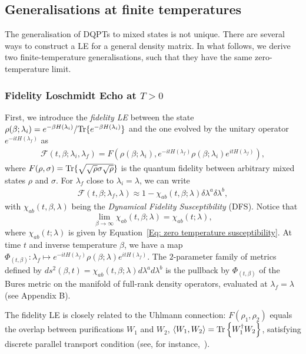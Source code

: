 \subsection{Generalisations at finite temperatures}
\label{Subsec: DQPT for pure states}


The generalisation of DQPTs to mixed states is not unique. There are several ways to construct a LE for a general density matrix. In what follows, we derive two finite-temperature generalisations, such that they have the same zero-temperature limit. \\
\subsubsection{Fidelity Loschmidt Echo at $T>0$}


First, we introduce the {\em fidelity LE} between the state $\rho(\beta;\lambda_i)=e^{-\beta H(\lambda_i)}/\text{Tr}\{e^{-\beta H(\lambda_i)}\}$ and the one evolved by the unitary operator $e^{-it H(\lambda_f)}$ as
\begin{eqnarray}
\!\!\!\!\!\!\mathcal{F}(t,\beta;\lambda_i,\lambda_f)\!=\!F(\rho(\beta;\lambda_i),e^{-it H(\lambda_f)}\rho(\beta;\lambda_i)e^{itH(\lambda_f)}),
\label{eq:fid}
\end{eqnarray}
where $F(\rho,\sigma)=\text{Tr}\{\sqrt{\sqrt{\rho}\sigma\sqrt{\rho}}\}$ is the quantum fidelity between arbitrary mixed states $\rho$ and $\sigma$. For $\lambda_f$ close to $\lambda_i=\lambda$, we can write
\begin{eqnarray}
\mathcal{F}(t,\beta ;\lambda_f,\lambda)\approx 1 -\chi_{ab}(t,\beta ;\lambda)\delta \lambda^a \delta \lambda^b,
\end{eqnarray}
with $\chi_{ab}(t,\beta,\lambda)$ being the \emph{Dynamical Fidelity Susceptibility} (DFS). Notice that $$\lim_{\beta\to\infty}\chi_{ab}(t,\beta;\lambda)=\chi_{ab}(t;\lambda),$$ where $\chi_{ab}(t;\lambda)$ is given by Equation~\eqref{Eq: zero temperature susceptibility}. At time $t$ and inverse temperature $\beta$, we have a map $\Phi_{(t,\beta)}: \lambda_f\mapsto e^{-i tH (\lambda_f)} \rho(\beta;\lambda) e^{it H(\lambda_f)}$. The $2$-parameter family of metrics defined by $ds^2(\beta,t)=\chi_{ab}(t,\beta;\lambda)d\lambda^{a}d\lambda^b$ is the pullback by $\Phi_{(t,\beta)}$ of the Bures metric on the manifold of full-rank density operators, evaluated at $\lambda_f=\lambda$ (see Appendix B).

The fidelity LE is closely related to the Uhlmann connection: $F(\rho_1,\rho_2)$ equals the overlap between purifications $W_1$ and $W_2$, $\langle W_1,W_2\rangle=\text{Tr} \left\{W_1^\dagger W_2\right\}$, satisfying discrete parallel transport condition (see, for instance,~\cite{uhl:11}). 


